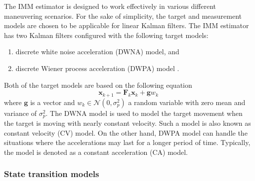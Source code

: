 \documentclass[english, 12pt, a4paper, elec, utf8, a-1b, online]{aaltothesis}
\renewcommand{\vec}[1]{\mathbf{#1}}
\newcommand{\normal}[2]{\mathcal{N}\left(#1, #2 \right)}
\begin{document}
The IMM estimator is designed to work effectively in various different maneuvering scenarios.
For the sake of simplicity, the target and measurement models are chosen to be applicable for linear Kalman filters.
The IMM estimator has two Kalman filters configured with the following target models: 
\begin{enumerate}
    \item discrete white noise acceleration (DWNA) model, and
    \item discrete Wiener process acceleration (DWPA) model \cite{BarShalom2001}.
\end{enumerate}
Both of the target models are based on the following equation 
\begin{equation}
    \vec{x}_{k+1} = \mathbf{F}_k \vec{x}_k + \vec{g} w_k
\end{equation}
where $\vec{g}$ is a vector and $w_k \in \normal{0}{\sigma_p^2}$ a random variable with zero mean and variance of $\sigma_p^2$.   
The DWNA model is used to model the target movement when the target is moving with nearly constant velocity.
Such a model is also known as constant velocity (CV) model.
On the other hand, DWPA model can handle the situations where the accelerations may last for a longer period of time. 
Typically, the model is denoted as a constant acceleration (CA) model.

\subsubsection{State transition models}
\label{sec:imm_st_models}
\end{document}
